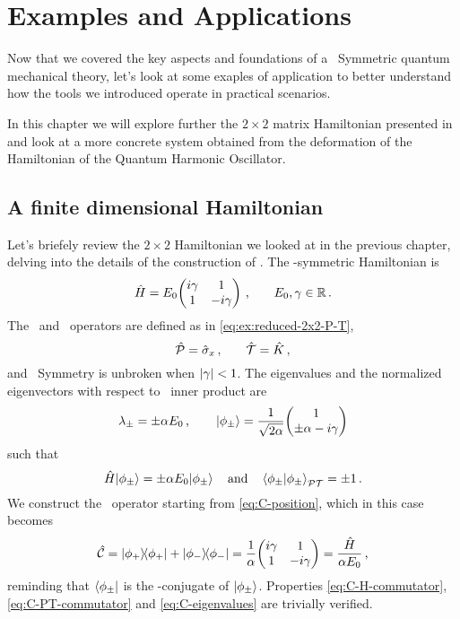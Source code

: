 \chapter{Examples and Applications}\label{ch:examples}
    Now that we covered the key aspects and foundations of a \PT\ Symmetric quantum mechanical theory, let's look at some exaples of application to better understand how the tools we introduced operate in practical scenarios.
    
    In this chapter we will explore further the $2\times2$ matrix Hamiltonian presented in  and look at a more concrete system obtained from the deformation of the Hamiltonian of the Quantum Harmonic Oscillator.
    \section{A finite dimensional Hamiltonian}
        Let's briefely review the $2\times2$ Hamiltonian we looked at in the previous chapter, delving into the details of the construction of \hC. The \PT-symmetric Hamiltonian is
        \begin{equation}
            \hH = E_0\! \pmqty{\dmat[1]{i\gamma, -i\gamma}}
            \mycomma \qquad
            E_0,\gamma \in \bbR
            \myperiod
        \end{equation}
        The \hP\ and \hT\ operators are defined as in \eqref{eq:ex:reduced-2x2-P-T},
        \begin{equation*}
            \mathcal{\hat{P}} = \hat{\sigma}_x \,\text{,} \qquad \mathcal{\hat{T}} = \hat{K}
            \,\text{,}
        \end{equation*}
        and \PT\ Symmetry is unbroken when $\abs{\gamma} < 1$. The eigenvalues and the normalized eigenvectors with respect to \PT\ inner product are
        \begin{equation*}
            \lambda_\pm = \pm \alpha E_0
            \mycomma
            \qquad
            \ket{\phi_\pm} = \frac{1}{\sqrt{2\alpha}} \!\pmqty{1 \\ \pm\alpha - i \gamma}
        \end{equation*}
        such that
        \begin{equation*}
            \hH \!\ket{\phi_\pm} = \pm \alpha E_0 \!\ket{\phi_\pm}
            \qand
            \braket{\phi_\pm}{\phi_\pm}_{\PT} = \pm 1
            \myperiod
        \end{equation*}
        We construct the \hC\ operator starting from \eqref{eq:C-position}, which in this case becomes
        \begin{equation}
            \hC = \dyad{\phi_+}{\phi_+} + \dyad{\phi_-}{\phi_-}
            = \frac{1}{\alpha} \!\pmqty{\dmat[1]{i\gamma, -i\gamma}}
            = \frac{\hH}{\alpha E_0}
            \mycomma
        \end{equation}
        reminding that $\bra{\phi_\pm}$ is the \PT-conjugate of $\ket{\phi_\pm}$. Properties \eqref{eq:C-H-commutator}, \eqref{eq:C-PT-commutator} and \eqref{eq:C-eigenvalues} are trivially verified.

